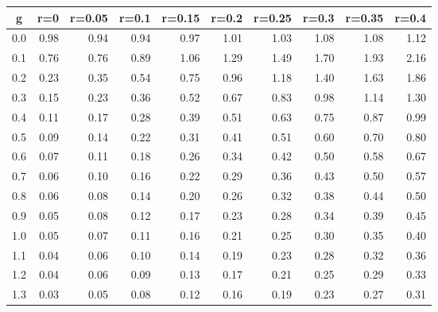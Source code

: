 %
\begin{table}[!tbp]
 \begin{center}
 \begin{tabular}{rrrrrrrrrr}\hline\hline
\multicolumn{1}{c}{g}&\multicolumn{1}{c}{r=0}&\multicolumn{1}{c}{r=0.05}&\multicolumn{1}{c}{r=0.1}&\multicolumn{1}{c}{r=0.15}&\multicolumn{1}{c}{r=0.2}&\multicolumn{1}{c}{r=0.25}&\multicolumn{1}{c}{r=0.3}&\multicolumn{1}{c}{r=0.35}&\multicolumn{1}{c}{r=0.4}\tabularnewline
\hline
0.0&0.98&0.94&0.94&0.97&1.01&1.03&1.08&1.08&1.12\tabularnewline
0.1&0.76&0.76&0.89&1.06&1.29&1.49&1.70&1.93&2.16\tabularnewline
0.2&0.23&0.35&0.54&0.75&0.96&1.18&1.40&1.63&1.86\tabularnewline
0.3&0.15&0.23&0.36&0.52&0.67&0.83&0.98&1.14&1.30\tabularnewline
0.4&0.11&0.17&0.28&0.39&0.51&0.63&0.75&0.87&0.99\tabularnewline
0.5&0.09&0.14&0.22&0.31&0.41&0.51&0.60&0.70&0.80\tabularnewline
0.6&0.07&0.11&0.18&0.26&0.34&0.42&0.50&0.58&0.67\tabularnewline
0.7&0.06&0.10&0.16&0.22&0.29&0.36&0.43&0.50&0.57\tabularnewline
0.8&0.06&0.08&0.14&0.20&0.26&0.32&0.38&0.44&0.50\tabularnewline
0.9&0.05&0.08&0.12&0.17&0.23&0.28&0.34&0.39&0.45\tabularnewline
1.0&0.05&0.07&0.11&0.16&0.21&0.25&0.30&0.35&0.40\tabularnewline
1.1&0.04&0.06&0.10&0.14&0.19&0.23&0.28&0.32&0.36\tabularnewline
1.2&0.04&0.06&0.09&0.13&0.17&0.21&0.25&0.29&0.33\tabularnewline
1.3&0.03&0.05&0.08&0.12&0.16&0.19&0.23&0.27&0.31\tabularnewline
\hline
\end{tabular}

\end{center}

\end{table}

